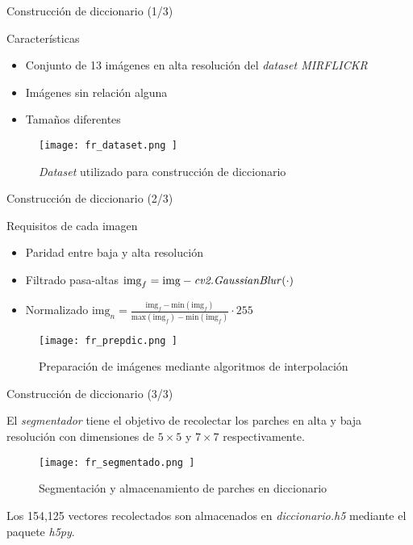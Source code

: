 \begin{frame}{Construcción de diccionario (1/3)}

    \begin{block}{Características}
        \begin{itemize}
            \item Conjunto de 13 imágenes en alta resolución del \emph{dataset MIRFLICKR}
            \item Imágenes sin relación alguna
            \item Tamaños diferentes
        \end{itemize}
    \end{block}

    \begin{figure}[H]
        \texttt{[image:  fr\_dataset.png ]}
        \centering
        \caption{ \emph{Dataset} utilizado para construcción de diccionario}
        \label{fig:fr_dataset}
    \end{figure}
\end{frame}

\begin{frame}{Construcción de diccionario (2/3)}

    \begin{block}{Requisitos de cada imagen}
        \begin{itemize}
            \item Paridad entre baja y alta resolución
            \item Filtrado pasa-altas
            $\text{img}_f = \text{img} - \text{\emph{cv2.GaussianBlur}}(\cdot)$
            \item Normalizado
            $\text{img}_n = \frac{\text{img}_f-\text{min}(\text{img}_f)}{\text{max}(\text{img}_f)-\text{min}(\text{img}_f)}\cdot 255$
        \end{itemize}
    \end{block}

    \begin{figure}[H]
        \texttt{[image:  fr\_prepdic.png ]}
        \centering
        \caption{Preparación de imágenes mediante algoritmos de interpolación}
        \label{fig:fr_interpolacion}
    \end{figure}
\end{frame}

\begin{frame}{Construcción de diccionario (3/3)}

    El \emph{segmentador} tiene el objetivo de recolectar los parches en alta y baja resolución con 
    dimensiones de $5\times5$ y $7\times7$ respectivamente.

    \begin{figure}[H]
        \texttt{[image:  fr\_segmentado.png ]}
        \centering
        \caption{ Segmentación y almacenamiento de parches en diccionario }
        \label{fig:fr_segmentador}
    \end{figure}

    Los 154,125 vectores recolectados son almacenados en \emph{diccionario.h5} mediante
    el paquete \emph{h5py}.

\end{frame}

